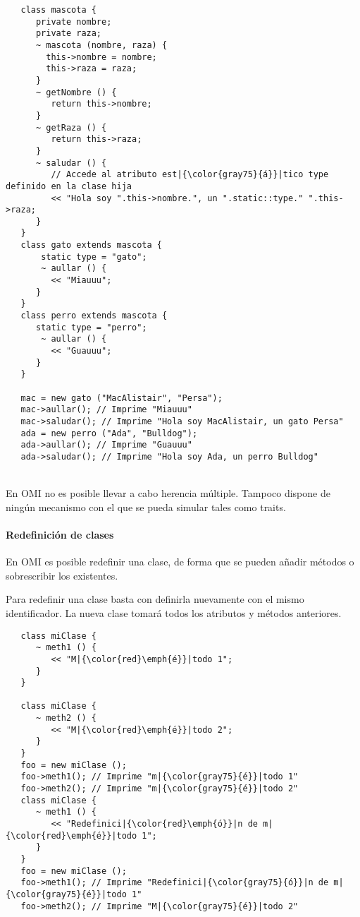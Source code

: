 \begin{lstlisting}
   class mascota {
      private nombre; 
      private raza;
      ~ mascota (nombre, raza) { 
        this->nombre = nombre; 
        this->raza = raza;
      }
      ~ getNombre () {
         return this->nombre;
      }
      ~ getRaza () {
         return this->raza;
      }
      ~ saludar () {
         // Accede al atributo est|{\color{gray75}{á}}|tico type definido en la clase hija
         << "Hola soy ".this->nombre.", un ".static::type." ".this->raza;  
      }
   }
   class gato extends mascota {
       static type = "gato";
       ~ aullar () { 
         << "Miauuu";
      }
   }
   class perro extends mascota {
      static type = "perro";
       ~ aullar () { 
         << "Guauuu";
      }
   }
   
   mac = new gato ("MacAlistair", "Persa"); 
   mac->aullar(); // Imprime "Miauuu"
   mac->saludar(); // Imprime "Hola soy MacAlistair, un gato Persa"
   ada = new perro ("Ada", "Bulldog"); 
   ada->aullar(); // Imprime "Guauuu"
   ada->saludar(); // Imprime "Hola soy Ada, un perro Bulldog"

\end{lstlisting}
\hfill\\ 


En OMI no es posible llevar a cabo herencia múltiple. Tampoco dispone de ningún
mecanismo con el que se pueda simular tales como traits. 

\paragraph{Redefinición de clases}
En OMI es posible redefinir una clase, de forma que se pueden añadir métodos o sobrescribir los 
existentes. 

Para redefinir una clase basta con definirla nuevamente con el mismo identificador. La nueva 
clase tomará todos los atributos y métodos anteriores. \\

\begin{lstlisting}
   class miClase {
      ~ meth1 () {
         << "M|{\color{red}\emph{é}}|todo 1";
      }
   }
   
   class miClase {
      ~ meth2 () {
         << "M|{\color{red}\emph{é}}|todo 2";
      }
   }
   foo = new miClase ();
   foo->meth1(); // Imprime "m|{\color{gray75}{é}}|todo 1"
   foo->meth2(); // Imprime "m|{\color{gray75}{é}}|todo 2"
   class miClase {
      ~ meth1 () {
         << "Redefinici|{\color{red}\emph{ó}}|n de m|{\color{red}\emph{é}}|todo 1";
      }
   }
   foo = new miClase ();
   foo->meth1(); // Imprime "Redefinici|{\color{gray75}{ó}}|n de m|{\color{gray75}{é}}|todo 1"
   foo->meth2(); // Imprime "M|{\color{gray75}{é}}|todo 2"
\end{lstlisting}
\hfill\\ 


